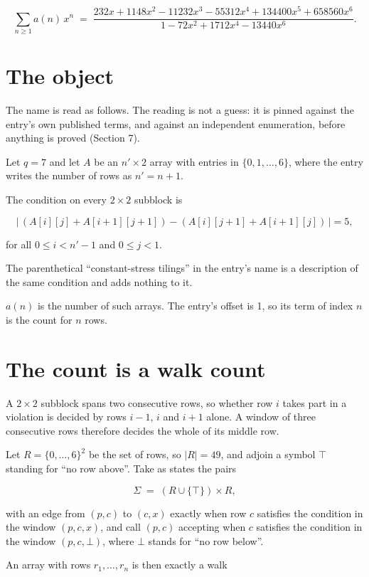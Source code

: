 \documentclass[11pt]{article}
\theoremstyle{definition}
\begin{document}
\[\sum_{n \ge 1} a(n)\,x^n \;=\; \frac{232x + 1148x^{2} - 11232x^{3} - 55312x^{4} + 134400x^{5} + 658560x^{6}}{1 - 72x^{2} + 1712x^{4} - 13440x^{6}}.\]

\section{The object}

The name is read as follows. The reading is not a guess: it is pinned against the entry's own published terms, and against an independent enumeration, before anything is proved (Section 7).

Let $q = 7$ and let $A$ be an $n' \times 2$ array with entries in $\{0,1,\dots,6\}$, where the entry writes the number of rows as $n' = n + 1$.

The condition on every $2 \times 2$ subblock is

\[\bigl|\,(A[i][j] + A[i{+}1][j{+}1]) - (A[i][j{+}1] + A[i{+}1][j])\,\bigr| = 5,\]

for all $0 \le i < n'-1$ and $0 \le j < 1$.

The parenthetical ``constant-stress tilings'' in the entry's name is a description of the same condition and adds nothing to it.

$a(n)$ is the number of such arrays. The entry's offset is 1, so its term of index $n$ is the count for $n$ rows.

\section{The count is a walk count}

A $2 \times 2$ subblock spans two consecutive rows, so whether row $i$ takes part in a violation is decided by rows $i-1$, $i$ and $i+1$ alone. A window of three consecutive rows therefore decides the whole of its middle row.

Let $R = \{0,\dots,6\}^{2}$ be the set of rows, so $|R| = 49$, and adjoin a symbol $\top$ standing for ``no row above''. Take as states the pairs

\[\Sigma \;=\; (R \cup \{\top\}) \times R,\]

with an edge from $(p,c)$ to $(c,x)$ exactly when row $c$ satisfies the condition in the window $(p,c,x)$, and call $(p,c)$ accepting when $c$ satisfies the condition in the window $(p,c,\bot)$, where $\bot$ stands for ``no row below''.

An array with rows $r_1,\dots,r_n$ is then exactly a walk
\end{document}
